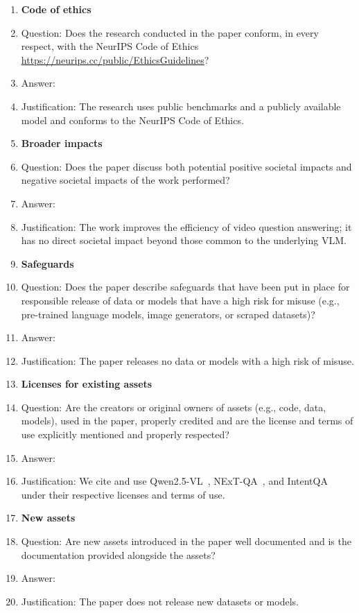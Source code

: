 \begin{enumerate}
\item {\bf Code of ethics}
    \item[] Question: Does the research conducted in the paper conform, in every respect, with the NeurIPS Code of Ethics \url{https://neurips.cc/public/EthicsGuidelines}?
    \item[] Answer: \answerYes{}
    \item[] Justification: The research uses public benchmarks and a publicly available model and conforms to the NeurIPS Code of Ethics.

\item {\bf Broader impacts}
    \item[] Question: Does the paper discuss both potential positive societal impacts and negative societal impacts of the work performed?
    \item[] Answer: \answerNA{}
    \item[] Justification: The work improves the efficiency of video question answering; it has no direct societal impact beyond those common to the underlying VLM.

\item {\bf Safeguards}
    \item[] Question: Does the paper describe safeguards that have been put in place for responsible release of data or models that have a high risk for misuse (e.g., pre-trained language models, image generators, or scraped datasets)?
    \item[] Answer: \answerNA{}
    \item[] Justification: The paper releases no data or models with a high risk of misuse.

\item {\bf Licenses for existing assets}
    \item[] Question: Are the creators or original owners of assets (e.g., code, data, models), used in the paper, properly credited and are the license and terms of use explicitly mentioned and properly respected?
    \item[] Answer: \answerYes{}
    \item[] Justification: We cite and use Qwen2.5-VL~\citep{qwen25vl}, NExT-QA~\citep{nextqa}, and IntentQA~\citep{intentqa} under their respective licenses and terms of use.

\item {\bf New assets}
    \item[] Question: Are new assets introduced in the paper well documented and is the documentation provided alongside the assets?
    \item[] Answer: \answerNA{}
    \item[] Justification: The paper does not release new datasets or models.


\end{enumerate}
